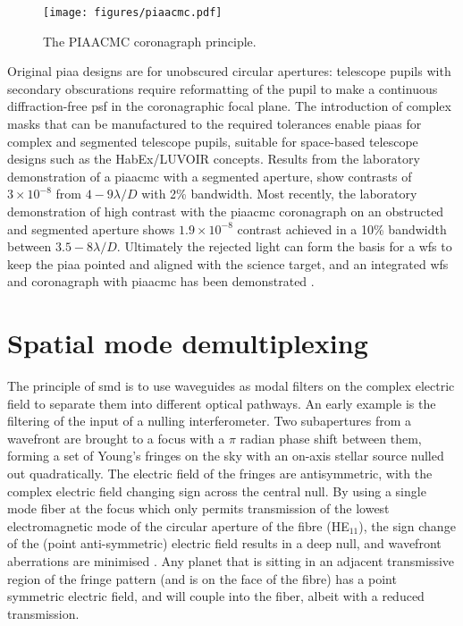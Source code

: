 \documentclass[letterpaper]{ar-1col}
\newcommand{\ld}{$\lambda/D$}
\begin{document}
\begin{figure}[ht]
  \centering
  \texttt{[image: figures/piaacmc.pdf]}
  \caption{The PIAACMC coronagraph principle.}
  \label{fig:piaatypes}
\end{figure}

Original \ac{piaa} designs are for unobscured circular apertures: telescope pupils with secondary obscurations require reformatting of the pupil to make a continuous diffraction-free \ac{psf} in the coronagraphic focal plane.
%
The introduction of complex masks that can be manufactured to the required tolerances enable \ac{piaa}s for complex and segmented telescope pupils, suitable for space-based telescope designs such as the HabEx/LUVOIR concepts.
%
Results from the laboratory demonstration of a \ac{piaacmc} with a segmented aperture, \citet{Marx21} show contrasts of $3\times 10^{-8}$ from $4-9$\ld{} with 2\% bandwidth.
%
Most recently, the laboratory demonstration of high contrast with the \ac{piaacmc} coronagraph on an obstructed and segmented aperture \citep{Belikov22} shows $1.9\times 10^{-8}$ contrast achieved in a 10\% bandwidth between $3.5-8$\ld{}.
%
Ultimately the rejected light can form the basis for a \ac{wfs} to keep the \ac{piaa} pointed and aligned with the science target, and an integrated \ac{wfs} and coronagraph with \ac{piaacmc} has been demonstrated \citep{Haffert23a}.

\section{Spatial mode demultiplexing}

The principle of \ac{smd} is to use waveguides as modal filters on the complex electric field to separate them into different optical pathways.
%
An early example is the filtering of the input of a nulling interferometer.
%
Two subapertures from a wavefront are brought to a focus with a $\pi$ radian phase shift between them, forming a set of Young's fringes on the sky with an on-axis stellar source nulled out quadratically.
%
The electric field of the fringes are antisymmetric, with the complex electric field changing sign across the central null.
%
By using a single mode fiber at the focus  which only permits transmission of the lowest electromagnetic mode of the circular aperture of the fibre (HE$_{11}$), the sign change of the (point anti-symmetric) electric field results in a deep null, and wavefront aberrations are minimised \citet{Serabyn06,Haguenauer06}.
%
Any planet that is sitting in an adjacent transmissive region of the fringe pattern (and is on the face of the fibre) has a point symmetric electric field, and will couple into the fiber, albeit with a reduced transmission.
\end{document}
